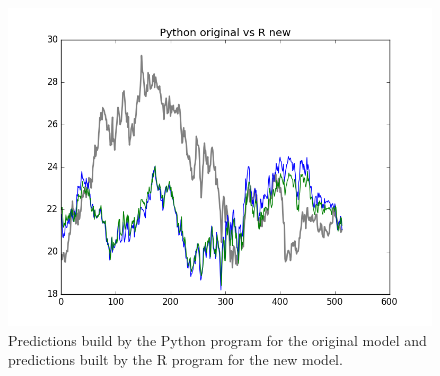 \documentclass[
  twoside,
  11pt, a4paper,
  footinclude=true,
  headinclude=true,
  cleardoublepage=empty
]{scrreprt}
\begin{document}
    \begin{figure}[H]
        \includegraphics[scale=0.5]{PythonOriginalVsRNew.png}
        \centering
        \caption{Predictions build by the Python program for the original model and predictions built by the R program for the new model.}
        \label{fig:PythonOriginalVsRNew}
    \end{figure}
\end{document}
